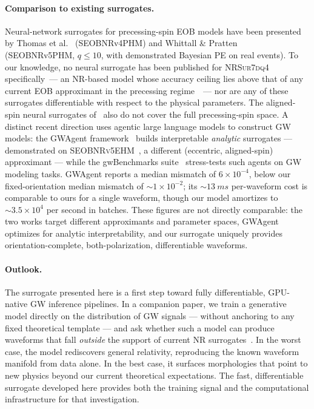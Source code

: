 \documentclass[aps,prd,twocolumn,superscriptaddress,longbibliography]{revtex4-2}
\newcommand{\NRSur}{\textsc{NRSur7dq4}}
\begin{document}
\paragraph{Comparison to existing surrogates.}
Neural-network surrogates for precessing-spin EOB models have been
presented by Thomas et al.~\cite{Thomas:2022} (SEOBNRv4PHM) and
Whittall \& Pratten~\cite{Whittall:2026} (SEOBNRv5PHM, $q\leq10$,
with demonstrated Bayesian PE on real events).
To our knowledge, no neural surrogate has been published for
\NRSur{} specifically~--- an NR-based model whose accuracy ceiling
lies above that of any current EOB approximant in the precessing
regime~\cite{Varma:2019csw}~--- nor are any of these surrogates
differentiable with respect to the physical parameters.
The aligned-spin neural surrogates of~\cite{Chua:2018woh,Khan:2020fso}
also do not cover the full precessing-spin space.
A distinct recent direction uses agentic large language models to
construct GW models: the GWAgent framework~\cite{GWAgent:2605.11280}
builds interpretable \emph{analytic} surrogates --- demonstrated on
\textsc{SEOBNRv5EHM}~\cite{Gamboa:2024}, a different (eccentric,
aligned-spin) approximant --- while the gwBenchmarks
suite~\cite{gwBenchmarks:2605.11269} stress-tests such agents on GW
modeling tasks.
GWAgent reports a median mismatch of $6\times10^{-4}$, below our
fixed-orientation median mismatch of $\sim\!1\times10^{-2}$; its
$\sim\!\SI{13}{ms}$ per-waveform cost is comparable to ours for a single
waveform, though our model amortizes to $\sim\!3.5\times10^4$ per second in
batches. These figures are not directly comparable: the two works target
different approximants and parameter spaces, GWAgent optimizes for analytic
interpretability, and our surrogate uniquely provides orientation-complete,
both-polarization, differentiable waveforms.

\paragraph{Outlook.}
The surrogate presented here is a first step toward
fully differentiable, GPU-native GW inference pipelines.
In a companion paper, we train a generative model directly on the
distribution of GW signals --- without anchoring to any fixed
theoretical template --- and ask whether such a model can produce
waveforms that fall \emph{outside} the support of current
NR surrogates~\cite{Modrekiladze:GW_AI:2024,Modrekiladze:transfer:2024}.
In the worst case, the model rediscovers general relativity,
reproducing the known waveform manifold from data alone.
In the best case, it surfaces morphologies that point to
new physics beyond our current theoretical expectations.
The fast, differentiable surrogate developed here provides both
the training signal and the computational infrastructure for
that investigation.
\end{document}
